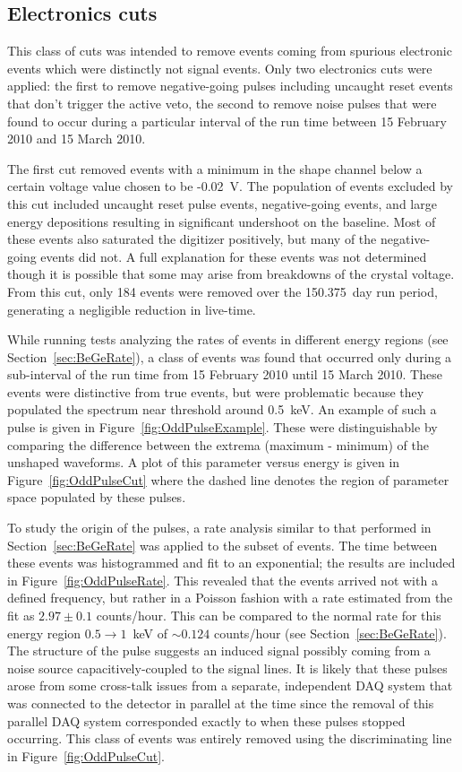 	
		\subsection{Electronics cuts}
		\label{sec:BeGeElecCuts}
	
	This class of cuts was intended to remove events coming from spurious electronic events which were distinctly not signal events.  Only two electronics cuts were applied: the first to remove negative-going pulses including uncaught reset events that don't trigger the active veto, the second to remove noise pulses that were found to occur during a particular interval of the run time between 15 February 2010 and 15 March 2010.  
	
	The first cut removed events with a minimum in the shape channel below a certain voltage value chosen to be -0.02~V.  The population of events excluded by this cut included uncaught reset pulse events, negative-going events, and large energy depositions resulting in significant undershoot on the baseline.  Most of these events also saturated the digitizer positively, but many of the negative-going events did not.  A full explanation for these events was not determined though it is possible that some may arise from breakdowns of the crystal voltage.  From this cut, only 184 events were removed over the 150.375~day run period, generating a negligible reduction in live-time.
	
	While running tests analyzing the rates of events in different energy regions (see Section~\ref{sec:BeGeRate}), a class of events was found that occurred only during a sub-interval of the run time from 15 February 2010 until 15 March 2010.  These events were distinctive from true events, but were problematic because they populated the spectrum near threshold around 0.5~keV.   An example of such a pulse is given in Figure~\ref{fig:OddPulseExample}.  These were distinguishable by comparing the difference between the extrema (maximum - minimum) of the unshaped waveforms.  A plot of this parameter versus energy is given in Figure~\ref{fig:OddPulseCut} where the dashed line denotes the region of parameter space populated by these pulses.  
	
	To study the origin of the pulses, a rate analysis similar to that performed in Section~\ref{sec:BeGeRate} was applied to the subset of events.  The time between these events was histogrammed and fit to an exponential; the results are included in Figure~\ref{fig:OddPulseRate}.  This revealed that the events arrived not with a defined frequency, but rather in a Poisson fashion with a rate estimated from the fit as $2.97 \pm 0.1$ counts/hour.  This can be compared to the normal rate for this energy region $0.5\to1$~keV of $\sim0.124$ counts/hour (see Section~\ref{sec:BeGeRate}).  The structure of the pulse suggests an induced signal possibly coming from a noise source capacitively-coupled to the signal lines.  It is likely that these pulses arose from some cross-talk issues from a separate, independent DAQ system that was connected to the detector in parallel at the time since the removal of this parallel DAQ system corresponded exactly to when these pulses stopped occurring.  This class of events was entirely removed using the discriminating line in Figure~\ref{fig:OddPulseCut}.
	
